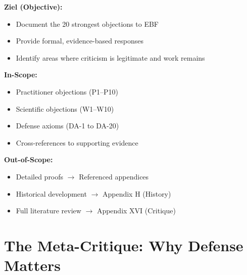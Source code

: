 \begin{tcolorbox}[
    colback=orange!5!white,
    colframe=orange!75!black,
    title={\textbf{Appendix Scope: Critical Defense}},
    fonttitle=\bfseries
]

\textbf{Ziel (Objective):}
\begin{itemize}[nosep]
    \item Document the 20 strongest objections to EBF
    \item Provide formal, evidence-based responses
    \item Identify areas where criticism is legitimate and work remains
\end{itemize}

\textbf{In-Scope:}
\begin{itemize}[nosep]
    \item Practitioner objections (P1--P10)
    \item Scientific objections (W1--W10)
    \item Defense axioms (DA-1 to DA-20)
    \item Cross-references to supporting evidence
\end{itemize}

\textbf{Out-of-Scope:}
\begin{itemize}[nosep]
    \item Detailed proofs $\rightarrow$ Referenced appendices
    \item Historical development $\rightarrow$ Appendix H (History)
    \item Full literature review $\rightarrow$ Appendix XVI (Critique)
\end{itemize}

\end{tcolorbox}

\section{The Meta-Critique: Why Defense Matters}
\label{sec:da-meta}

